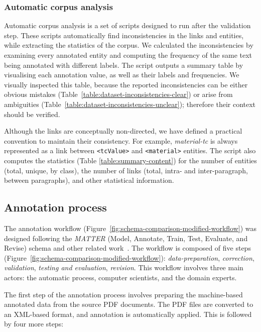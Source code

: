 \documentclass[fleqn,10pt]{wlscirep}
\begin{document}
\subsubsection*{Automatic corpus analysis}
Automatic corpus analysis is a set of scripts designed to run after the validation step. 
These scripts automatically find inconsistencies in the links and entities, while extracting the statistics of the corpus. 
We calculated the inconsistencies by examining every annotated entity and computing the frequency of the same text being annotated with different labels. 
The script outputs a summary table by visualising each annotation value, as well as their labels and frequencies.
We visually inspected this table, because the reported inconsistencies can be either obvious mistakes (Table~\ref{table:dataset-inconsistencies-clear}) or arise from ambiguities (Table~\ref{table:dataset-inconsistencies-unclear}); therefore their context should be verified. 

Although the links are conceptually non-directed, we have defined a practical convention to maintain their consistency. For example, \textit{material-tc} is always represented as a link between \texttt{<tcValue>} and \texttt{<material>} entities. 
The script also computes the statistics (Table \ref{table:summary-content}) for the number of entities (total, unique, by class), the number of links (total, intra- and inter-paragraph, between paragraphs), and other statistical information. 

\FloatBarrier
\subsection*{Annotation process}
\label{subsec:annotation-workflow}
The annotation workflow (Figure~\ref{fig:schema-comparison-modified-workflow}) was designed following the \textit{MATTER} (Model, Annotate, Train, Test, Evaluate, and Revise) schema\cite{pustejovsky2012natural} and other related work~\cite{Dieb2016, Krallinger2015TheCC}.
The workflow is composed of five steps (Figure~\ref{fig:schema-comparison-modified-workflow}): \textit{data-preparation}, \textit{correction}, \textit{validation}, \textit{testing and evaluation}, \textit{revision}. 
This workflow involves three main actors: the automatic process, computer scientists, and the domain experts.

The first step of the annotation process involves preparing the machine-based annotated data from the source PDF documents. 
The PDF files are converted to an XML-based format, and annotation is automatically applied. 
This is followed by four more steps: 
\end{document}
